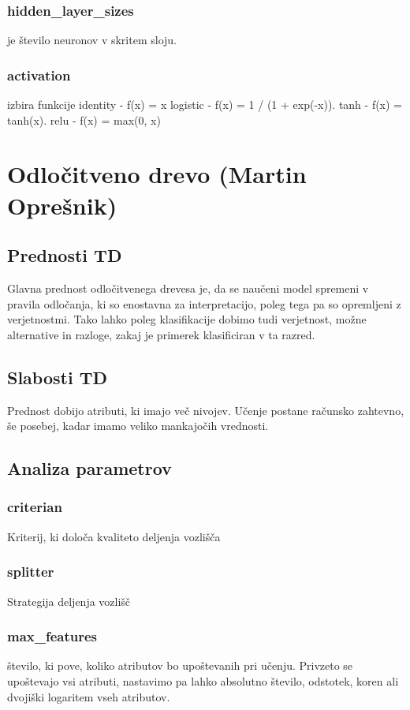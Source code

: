 \documentclass[a4paper,11pt]{article}
\begin{document}
	\subsubsection{hidden_layer_sizes}
		je število neuronov v skritem sloju.

	\subsubsection{activation}
		izbira funkcije
		identity - f(x) = x
		logistic - f(x) = 1 / (1 + exp(-x)).
		tanh - f(x) = tanh(x).
		relu - f(x) = max(0, x)
 
\section{Odločitveno drevo (Martin Oprešnik) }

\subsection{Prednosti TD}
	Glavna prednost odločitvenega drevesa je, da se naučeni model spremeni v pravila odločanja, ki so enostavna za interpretacijo, poleg tega pa so opremljeni z verjetnostmi. Tako lahko poleg klasifikacije dobimo tudi verjetnost, možne alternative in razloge, zakaj je primerek klasificiran v ta razred.

\subsection{Slabosti TD}
	Prednost dobijo atributi, ki imajo več nivojev.
	Učenje postane računsko zahtevno, še posebej, kadar imamo veliko mankajočih vrednosti.
	
\subsection{Analiza parametrov}
\subsubsection{criterian}
Kriterij, ki določa kvaliteto deljenja vozlišča

\subsubsection{splitter}
Strategija deljenja vozlišč

\subsubsection{max_features}
število, ki pove, koliko atributov bo upoštevanih pri učenju. Privzeto se upoštevajo vsi atributi,  nastavimo pa lahko absolutno število, odstotek, koren ali dvojiški logaritem vseh atributov.
\end{document}
